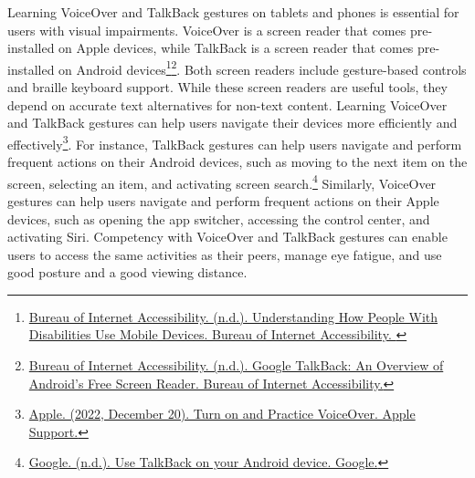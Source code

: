 Learning VoiceOver and TalkBack gestures on tablets and phones is essential for users with visual impairments. VoiceOver is a screen reader that comes pre-installed on Apple devices, while TalkBack is a screen reader that comes pre-installed on Android devices\footnote{\raggedright \href{https://www.boia.org/blog/understanding-how-people-with-disabilities-use-mobile-devices}{Bureau of Internet Accessibility. (n.d.). Understanding How People With Disabilities Use Mobile Devices. Bureau of Internet Accessibility. }}\footnote{\raggedright \href{https://www.boia.org/blog/google-talkback-an-overview-of-androids-free-screen-reader}{Bureau of Internet Accessibility. (n.d.). Google TalkBack: An Overview of Android's Free Screen Reader. Bureau of Internet Accessibility.}}. Both screen readers include gesture-based controls and braille keyboard support. While these screen readers are useful tools, they depend on accurate text alternatives for non-text content. Learning VoiceOver and TalkBack gestures can help users navigate their devices more efficiently and effectively\footnote{\raggedright \href{https://support.apple.com/guide/iphone/turn-on-and-practice-voiceover-iph3e2e415f/ios}{Apple. (2022, December 20). Turn on and Practice VoiceOver. Apple Support.}}. For instance, TalkBack gestures can help users navigate and perform frequent actions on their Android devices, such as moving to the next item on the screen, selecting an item, and activating screen search.\footnote{\raggedright \href{https://support.google.com/accessibility/android/answer/6151827?hl=en}{Google. (n.d.). Use TalkBack on your Android device. Google.}} Similarly, VoiceOver gestures can help users navigate and perform frequent actions on their Apple devices, such as opening the app switcher, accessing the control center, and activating Siri. Competency with VoiceOver and TalkBack gestures can enable users to access the same activities as their peers, manage eye fatigue, and use good posture and a good viewing distance.

